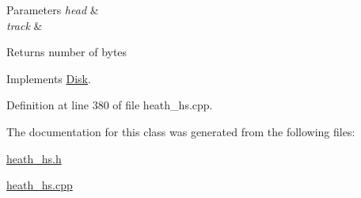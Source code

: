 \begin{DoxyParams}{Parameters}
{\em head} & \\
\hline
{\em track} & \\
\hline
\end{DoxyParams}
\begin{DoxyReturn}{Returns}
number of bytes 
\end{DoxyReturn}


Implements \hyperlink{classDisk}{Disk}.



Definition at line 380 of file heath\+\_\+hs.\+cpp.



The documentation for this class was generated from the following files\+:\begin{DoxyCompactItemize}
\item 
\hyperlink{heath__hs_8h}{heath\+\_\+hs.\+h}\item 
\hyperlink{heath__hs_8cpp}{heath\+\_\+hs.\+cpp}\end{DoxyCompactItemize}
